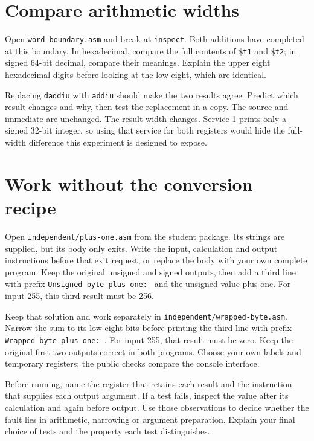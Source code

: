 \section{Compare arithmetic widths}

Open \texttt{word-boundary.asm} and break at \texttt{inspect}. Both additions
have completed at this boundary. In hexadecimal, compare the full contents of
\texttt{\$t1} and \texttt{\$t2}; in signed 64-bit decimal, compare their meanings.
Explain the upper eight hexadecimal digits before looking at the low eight,
which are identical.

Replacing \texttt{daddiu} with \texttt{addiu} should make the two results agree.
Predict which result changes and why, then test the replacement in a copy.
The source and immediate are unchanged. The result width changes. Service 1
prints only a signed 32-bit integer, so using that service for both registers
would hide the full-width difference this experiment is designed to expose.

\section{Work without the conversion recipe}

Open \texttt{independent/plus-one.asm} from the student package. Its strings
are supplied, but its body only exits. Write the input, calculation and output
instructions before that exit request, or replace the body with your own complete
program. Keep the original unsigned and signed outputs, then add a third line
with prefix \texttt{Unsigned byte plus one: } and the unsigned value plus one.
For input 255, this third result must be 256.

Keep that solution and work separately in
\texttt{independent/wrapped-byte.asm}. Narrow the sum to its low eight bits
before printing the third line with prefix \texttt{Wrapped byte plus one: }.
For input 255, that result must be zero. Keep the original first two outputs
correct in both programs. Choose your own labels and temporary registers; the
public checks compare the console interface.

Before running, name the register that retains each result and the instruction
that supplies each output argument. If a test fails, inspect the value after its
calculation and again before output. Use those observations to decide whether the
fault lies in arithmetic, narrowing or argument preparation. Explain your final
choice of tests and the property each test distinguishes.

